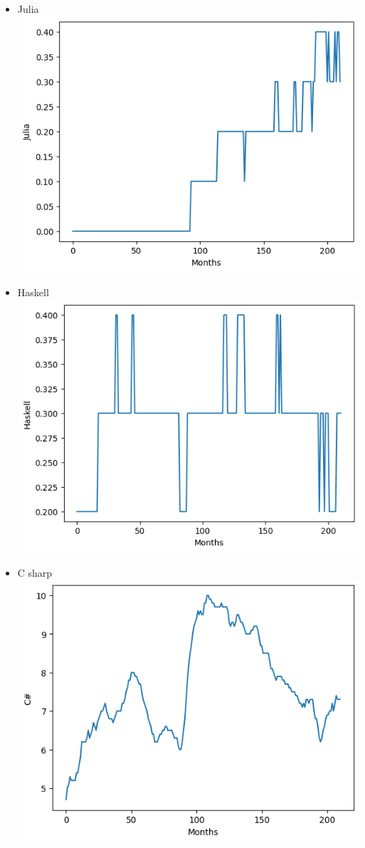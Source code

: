 \documentclass[conference]{IEEEtran}
\begin{document}
\begin{itemize}
\item{Julia}
\includegraphics[scale=0.4]{lineplot/julia.png}
\item{Haskell}
\includegraphics[scale=0.4]{lineplot/haskell.png}
\item{C sharp}
\includegraphics[scale=0.4]{lineplot/c-sharp.png}

\end{itemize}
\end{document}
